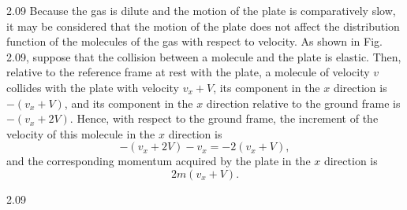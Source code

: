 \begin{solution}{2.09}
Because the gas is dilute and the motion of the plate is comparatively slow, it may be considered that the motion of the plate does not affect the distribution function of the molecules of the gas with respect to velocity. As shown in Fig. 2.09, suppose that the collision between a molecule and the plate is elastic. Then, relative to the reference frame at rest with the plate, a molecule of velocity $v$ collides with the plate with velocity $v_x+V$, its component in the $x$ direction is $-(v_x+V)$, and its component in the $x$ direction relative to the ground frame is $-(v_x+2V)$. Hence, with respect to the ground frame, the increment of the velocity of this molecule in the $x$ direction is
\[
-(v_x+2V)-v_x=-2(v_x+V),
\]
and the corresponding momentum acquired by the plate in the $x$ direction is
\[
2m(v_x+V).
\]

\begin{figbox}{2.09}
\end{figbox}


\end{solution}
